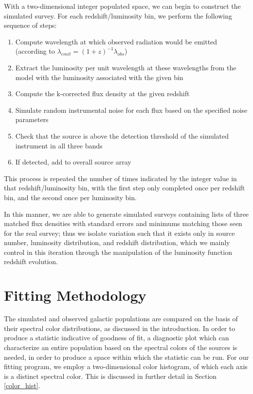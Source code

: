 \documentclass[twocolumn,letterpaper,10pt]{article}
\begin{document}
With a two-dimensional integer populated space, we can begin to construct the simulated survey. For each redshift/luminosity bin, we perform the following sequence of steps:
\begin{enumerate}
\item Compute wavelength at which observed radiation would be emitted (according to $\lambda_{emit}=(1+z)^{-1}\lambda_{obs}$)
\item Extract the luminosity per unit wavelength at these wavelengths from the model with the luminosity associated with the given bin
\item Compute the k-corrected flux density at the given redshift
\item Simulate random instrumental noise for each flux based on the specified noise parameters
\item Check that the source is above the detection threshold of the simulated instrument in all three bands
\item If detected, add to overall source array
\end{enumerate}
This process is repeated the number of times indicated by the integer value in that redshift/luminosity bin, with the first step only completed once per redshift bin, and the second once per luminosity bin. 

In this manner, we are able to generate simulated surveys containing lists of three matched flux densities with standard errors and minimums matching those seen for the real survey; thus we isolate variation such that it exists only in source number, luminosity distribution, and redshift distribution, which we mainly control in this iteration through the manipulation of the luminosity function redshift evolution. 

\section{Fitting Methodology}\label{sec:fit}

The simulated and observed galactic populations are compared on the basis of their spectral color distributions, as discussed in the introduction. In order to produce a statistic indicative of goodness of fit, a diagnostic plot which can characterize an entire population based on the spectral colors of the sources is needed, in order to produce a space within which the statistic can be run. For our fitting program, we employ a two-dimensional color histogram, of which each axis is a distinct spectral color. This is discussed in further detail in Section \ref{color_hist}. 
\end{document}
